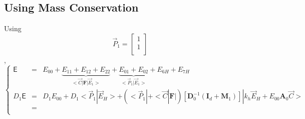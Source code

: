 \documentclass[aps,onecolumn,11pt]{revtex4}
\newcommand{\mymat}[1]{{\bm{#1}}}
\begin{document}
\subsection{Using Mass Conservation}
Using $$\vec{P}_1=\begin{bmatrix}1\\1\\\end{bmatrix}$$,
\begin{equation}
\left\lbrace
\begin{array}{rcl}
\mathsf{E}    & = & E_{00} + \underbrace{E_{11}+E_{12}+E_{22}}_{<\vec{C}|\mymat{F}|\vec{E}_1>} + \underbrace{E_{01}+E_{02}}_{<\vec{P}_1|\vec{E}_1>} + E_{6H} + E_{7H}\\
D_1\mathsf{E} & = & D_1E_{00} + D_1 <\vec{P}_1|\vec{E}_H> + 
	\left( <\vec{P}_1| + <\vec{C}|\mymat{F}| \right) 
	\left[ \mymat{D}_0^{-1} \left(\mymat{I}_d+\mymat{M}_1\right)\right]
	| k_h \vec{E}_H + E_{00} \mymat{A}_0 \vec{C} > \\
	& = & \\
\end{array}
\right.
\end{equation}
\end{document}
